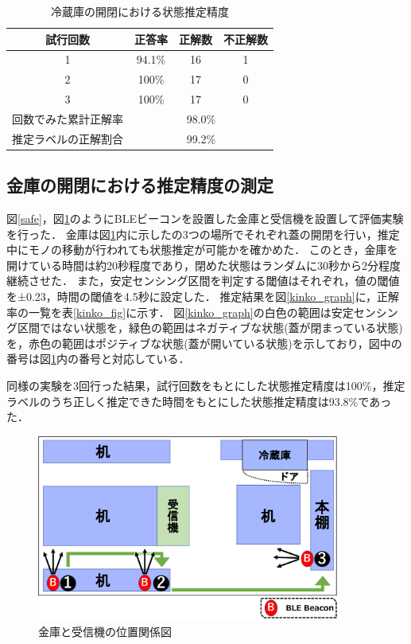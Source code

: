 \begin{table}[tbh]
    \begin{center}
        \caption{冷蔵庫の開閉における状態推定精度}
        \label{refrigerator_fig}
        \begin{tabular}{|c|c|c|c|} \hline
        試行回数 & 正答率 & 正解数 & 不正解数 \\ \hline
        1 & 94.1\% & 16 & 1 \\ \hline
        2 & 100\% & 17 & 0 \\ \hline
        3 & 100\% & 17 & 0 \\ \hline \hline
        回数でみた累計正解率 & \multicolumn{3}{c|}{98.0\%} \\ \hline \hline
        推定ラベルの正解割合 & \multicolumn{3}{c|}{99.2\%} \\ \hline
        \end{tabular}
    \end{center}
\end{table}


\subsection{金庫の開閉における推定精度の測定}
図\ref{safe}，図\ref{kinko_position}のようにBLEビーコンを設置した金庫と受信機を設置して評価実験を行った．
金庫は図\ref{kinko_position}内に示したの3つの場所でそれぞれ蓋の開閉を行い，推定中にモノの移動が行われても状態推定が可能かを確かめた．
このとき，金庫を開けている時間は約20秒程度であり，閉めた状態はランダムに30秒から2分程度継続させた．
また，安定センシング区間を判定する閾値はそれぞれ，値の閾値を±0.23，時間の閾値を4.5秒に設定した．
推定結果を図\ref{kinko_graph}に，正解率の一覧を表\ref{kinko_fig}に示す．
図\ref{kinko_graph}の白色の範囲は安定センシング区間ではない状態を，緑色の範囲はネガティブな状態(蓋が閉まっている状態)を，赤色の範囲はポジティブな状態(蓋が開いている状態)を示しており，図中の番号は図\ref{kinko_position}内の番号と対応している．

同様の実験を3回行った結果，試行回数をもとにした状態推定精度は100\%，推定ラベルのうち正しく推定できた時間をもとにした状態推定精度は93.8\%であった．

\begin{figure}[tbh]
    \centering
    \includegraphics[width=10cm]{images/chapter3/kinko_position_fig.pdf}
    \caption{金庫と受信機の位置関係図}
    \label{kinko_position}
\end{figure}

